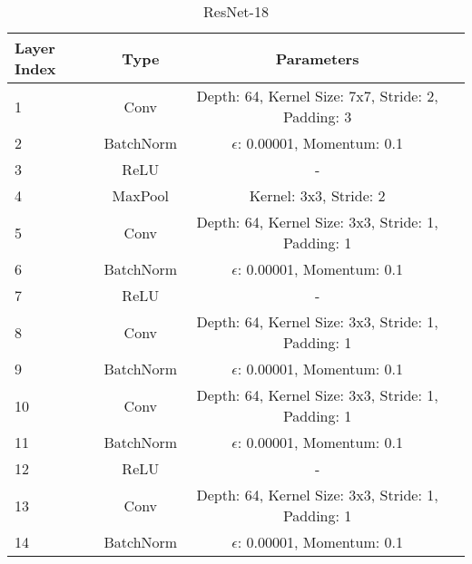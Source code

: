 \documentclass[10pt,twocolumn,letterpaper]{article}
\begin{document}
\begin{table}[ht]
    \vspace{-5mm}
    \caption{ResNet-18}
    \centering
    \scriptsize
    \begin{tabular}{|l|c|c|r}
        \toprule
        \toprule
        Layer Index & Type & Parameters \\
        \midrule
        \multirow{1}{0.5cm}{1} & Conv & Depth: 64, Kernel Size: 7x7, Stride: 2, Padding: 3\\
        \multirow{1}{0.5cm}{2} & BatchNorm & $\epsilon$: 0.00001, Momentum: 0.1\\
        \multirow{1}{0.5cm}{3} & ReLU & -\\
        \multirow{1}{0.5cm}{4} & MaxPool & Kernel: 3x3, Stride: 2\\
        
        \multirow{1}{0.5cm}{5} & Conv & Depth: 64, Kernel Size: 3x3, Stride: 1, Padding: 1\\
        \multirow{1}{0.5cm}{6} & BatchNorm & $\epsilon$: 0.00001, Momentum: 0.1\\
        \multirow{1}{0.5cm}{7} & ReLU & -\\
        \multirow{1}{0.5cm}{8} & Conv & Depth: 64, Kernel Size: 3x3, Stride: 1, Padding: 1\\
        \multirow{1}{0.5cm}{9} & BatchNorm & $\epsilon$: 0.00001, Momentum: 0.1\\
        \multirow{1}{0.5cm}{10} & Conv & Depth: 64, Kernel Size: 3x3, Stride: 1, Padding: 1\\
        \multirow{1}{0.5cm}{11} & BatchNorm & $\epsilon$: 0.00001, Momentum: 0.1\\
        \multirow{1}{0.5cm}{12} & ReLU & -\\
        \multirow{1}{0.5cm}{13} & Conv & Depth: 64, Kernel Size: 3x3, Stride: 1, Padding: 1\\
        \multirow{1}{0.5cm}{14} & BatchNorm & $\epsilon$: 0.00001, Momentum: 0.1\\
        

\end{tabular}
\end{table}
\end{document}
